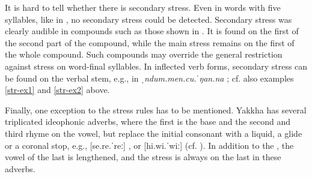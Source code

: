 It is hard to tell whether there is secondary stress. Even in words with five syllables, like in \Last[b], no secondary stress could be detected.  Secondary stress was clearly audible in compounds such as those shown in .  It is found on the first  of the second part of the compound, while the main stress remains on the first  of the whole compound. Such compounds may override the general restriction against stress on word-final syllables. In inflected verb forms, secondary stress can be found on the verbal stem, e.g., in \emph{ˌndum.men.cu.ˈŋan.na} ; cf. also examples \ref{str-ex1} and \ref{str-ex2} above.

 

 \begin{table}[htp]	
\caption{Stress in compounds}\label{stresscomp}

\end{table}



Finally, one exception to the stress rules has to be mentioned. Yakkha has several triplicated ideophonic adverbs, where the first  is the base and the second and third  rhyme on the vowel, but replace the initial consonant with a liquid, a glide or a coronal stop, e.g., [se.re.ˈreː] , or [hi.wi.ˈwiː]  (cf. ). In addition to the , the vowel of the last  is lengthened, and the stress is always on the last  in these adverbs.



